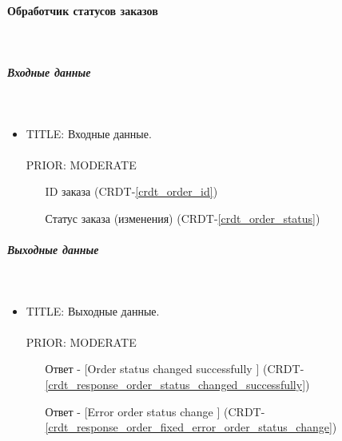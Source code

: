 \paragraph{Обработчик статусов заказов} \mbox{} \\ \label{service_order_status_processing}

	\subparagraph{Входные данные} \mbox{} \\ \label{}

      \begin{itemize}

        \item{

          TITLE: Входные данные.\\
          \\
          PRIOR: MODERATE\\

        }

          \begin{itemize}
            \item [ID заказа] (CRDT-\ref{crdt_order_id})
            \item [Статус заказа (изменения)] (CRDT-\ref{crdt_order_status})
          \end{itemize}

      \end{itemize}

    \subparagraph{Выходные данные} \mbox{} \\

      \begin{itemize}

        \item{

          TITLE: Выходные данные.\\
          \\
          PRIOR: MODERATE\\

        }

          \begin{itemize}
            \item [Ответ - [Order status changed successfully]] (CRDT-\ref{crdt_response_order_status_changed_successfully})
            \item [Ответ - [Error order status change]] (CRDT-\ref{crdt_response_order_fixed_error_order_status_change})
          \end{itemize}

      \end{itemize}


